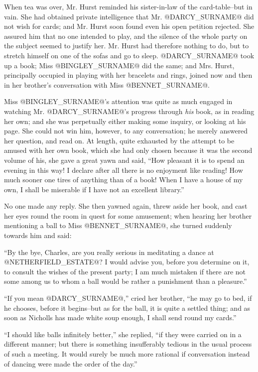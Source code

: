 When tea was over, Mr. Hurst reminded his sister-in-law of the
card-table--but in vain. She had obtained private intelligence that Mr.
@DARCY_SURNAME@ did not wish for cards; and Mr. Hurst soon found even his open
petition rejected. She assured him that no one intended to play, and
the silence of the whole party on the subject seemed to justify her. Mr.
Hurst had therefore nothing to do, but to stretch himself on one of the
sofas and go to sleep. @DARCY_SURNAME@ took up a book; Miss @BINGLEY_SURNAME@ did the same;
and Mrs. Hurst, principally occupied in playing with her bracelets
and rings, joined now and then in her brother's conversation with Miss
@BENNET_SURNAME@.

Miss @BINGLEY_SURNAME@'s attention was quite as much engaged in watching Mr.
@DARCY_SURNAME@'s progress through \textit{his} book, as in reading her own; and she
was perpetually either making some inquiry, or looking at his page. She
could not win him, however, to any conversation; he merely answered her
question, and read on. At length, quite exhausted by the attempt to be
amused with her own book, which she had only chosen because it was the
second volume of his, she gave a great yawn and said, ``How pleasant
it is to spend an evening in this way! I declare after all there is no
enjoyment like reading! How much sooner one tires of anything than of a
book! When I have a house of my own, I shall be miserable if I have not
an excellent library.''

No one made any reply. She then yawned again, threw aside her book, and
cast her eyes round the room in quest for some amusement; when hearing
her brother mentioning a ball to Miss @BENNET_SURNAME@, she turned suddenly
towards him and said:

``By the bye, Charles, are you really serious in meditating a dance at
@NETHERFIELD_ESTATE@? I would advise you, before you determine on it, to consult
the wishes of the present party; I am much mistaken if there are
not some among us to whom a ball would be rather a punishment than a
pleasure.''

``If you mean @DARCY_SURNAME@,'' cried her brother, ``he may go to bed, if he
chooses, before it begins--but as for the ball, it is quite a settled
thing; and as soon as Nicholls has made white soup enough, I shall send
round my cards.''

``I should like balls infinitely better,'' she replied, ``if they were
carried on in a different manner; but there is something insufferably
tedious in the usual process of such a meeting. It would surely be much
more rational if conversation instead of dancing were made the order of
the day.''

